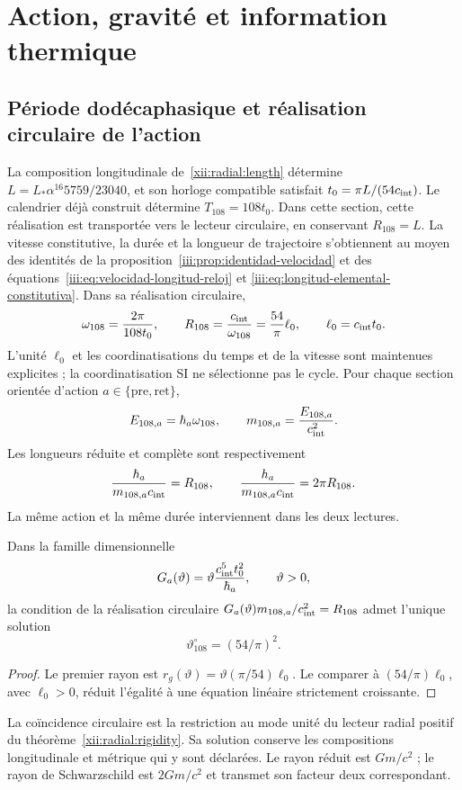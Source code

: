 \section{Action, gravité et information thermique}
\label{v:ant:sec:gravity}
\subsection{Période dodécaphasique et réalisation circulaire de l'action}
La composition longitudinale de~\eqref{xii:radial:length} détermine \(L=L_*\alpha^{16}5759/23040\), et son horloge compatible satisfait \(t_0=\pi L/(54c_{\rm int})\). Le calendrier déjà construit détermine $T_{108}=108t_0$. Dans cette section, cette réalisation est transportée vers le lecteur circulaire, en conservant \(R_{108}=L\). La vitesse constitutive, la durée et la longueur de trajectoire s'obtiennent au moyen des identités de la proposition~\ref{iii:prop:identidad-velocidad} et des équations~\eqref{iii:eq:velocidad-longitud-reloj} et \eqref{iii:eq:longitud-elemental-constitutiva}. Dans sa réalisation circulaire,
\[
\omega_{108}=\frac{2\pi}{108t_0},\qquad
R_{108}=\frac{c_{\rm int}}{\omega_{108}}
=\frac{54}{\pi}\ell_0,\qquad \ell_0=c_{\rm int}t_0.
\]
L’unité $\ell_0$ et les coordinatisations du temps et de la vitesse sont maintenues
explicites ; la coordinatisation SI ne sélectionne pas le cycle.
Pour chaque section orientée d’action $a\in\{\mathrm{pre},\mathrm{ret}\}$,
\[
E_{108,a}=\hbar_a\omega_{108},\qquad
m_{108,a}=\frac{E_{108,a}}{c_{\rm int}^2}.
\]
Les longueurs réduite et complète sont respectivement
\[
\frac{\hbar_a}{m_{108,a}c_{\rm int}}=R_{108},
\qquad
\frac{h_a}{m_{108,a}c_{\rm int}}=2\pi R_{108}.
\]
La même action et la même durée interviennent dans les deux lectures.

\begin{proposition}
Dans la famille dimensionnelle
\[
G_a(\vartheta)=\vartheta\frac{c_{\rm int}^5t_0^2}{\hbar_a},
\qquad \vartheta>0,
\]
la condition de la réalisation circulaire
$G_a(\vartheta)m_{108,a}/c_{\rm int}^2=R_{108}$
admet l'unique solution
\[
\vartheta^\circ_{108}=(54/\pi)^2.
\]
\end{proposition}
\begin{proof}
Le premier rayon est
$r_g(\vartheta)=\vartheta(\pi/54)\ell_0$.
Le comparer à $(54/\pi)\ell_0$, avec $\ell_0>0$, réduit
l'égalité à une équation linéaire strictement croissante.
\end{proof}
La coïncidence circulaire est la restriction au mode unité du lecteur
radial positif du théorème~\ref{xii:radial:rigidity}. Sa solution
conserve les compositions longitudinale et métrique qui y sont déclarées.
Le rayon réduit est \(Gm/c^2\) ; le rayon de Schwarzschild est
\(2Gm/c^2\) et transmet son facteur deux correspondant.

